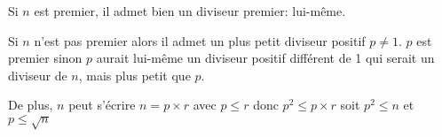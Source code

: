 
Si $n$ est premier, il admet bien un diviseur premier: lui-même.

Si $n$ n'est pas premier alors il admet un plus petit diviseur positif $p\neq 1$.
$p$ est premier sinon $p$ aurait lui-même un diviseur positif différent de 1 qui serait un diviseur de $n$, mais plus petit que $p$.

De plus, $n$ peut s'écrire $n=p \times r$ avec $p\leq r$ donc $p^{2}\leq p \times r$ soit $p^{2} \leq n$ et $p\leq\sqrt{n}$


